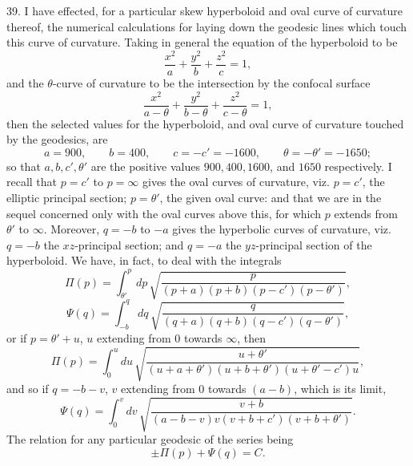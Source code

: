 \documentclass[11pt,a4paper]{article}
\begin{document}
39. I have effected, for a particular skew hyperboloid and oval curve of curvature thereof,
the numerical calculations for laying down the geodesic lines which touch this curve of
curvature. Taking in general the equation of the hyperboloid to be
\[
 \frac{x^2}{a}+\frac{y^2}{b}+\frac{z^2}{c}=1,
\]
and the $\theta$-curve of curvature to be the intersection by the confocal surface
\[
 \frac{x^2}{a-\theta}+\frac{y^2}{b-\theta}+\frac{z^2}{c-\theta}=1,
\]
then the selected values for the hyperboloid, and oval curve of curvature touched by the
geodesics, are
\[
 a=900,\qquad b=400,\qquad c=-c'=-1600,\qquad \theta=-\theta'=-1650;
\]
so that $a,b,c',\theta'$ are the positive values $900,400,1600$, and $1650$ respectively.
I recall that $p=c'$ to $p=\infty$ gives the oval curves of curvature, viz. $p=c'$, the
elliptic principal section; $p=\theta'$, the given oval curve: and that we are in the sequel
concerned only with the oval curves above this, for which $p$ extends from $\theta'$ to
$\infty$. Moreover, $q=-b$ to $-a$ gives the hyperbolic curves of curvature, viz.
$q=-b$ the $xz$-principal section; and $q=-a$ the $yz$-principal section of the hyperboloid.
We have, in fact, to deal with the integrals
\[
 \Pi(p)=\int_{\theta'}^p dp\,
 \sqrt{\frac{p}{(p+a)(p+b)(p-c')(p-\theta')}},
\]
\[
 \Psi(q)=\int_{-b}^{q} dq\,
 \sqrt{\frac{q}{(q+a)(q+b)(q-c')(q-\theta')}},
\]
or if $p=\theta'+u$, $u$ extending from 0 towards $\infty$, then
\[
 \Pi(p)=\int_0^u du\,
 \sqrt{\frac{u+\theta'}{(u+a+\theta')(u+b+\theta')(u+\theta'-c')u}},
\]
and so if $q=-b-v$, $v$ extending from 0 towards $(a-b)$, which is its limit,
\[
 \Psi(q)=\int_0^v dv\,
 \sqrt{\frac{v+b}{(a-b-v)v(v+b+c')(v+b+\theta')}}.
\]
The relation for any particular geodesic of the series being
\[
 \pm\Pi(p)+\Psi(q)=C.
\]
\end{document}
